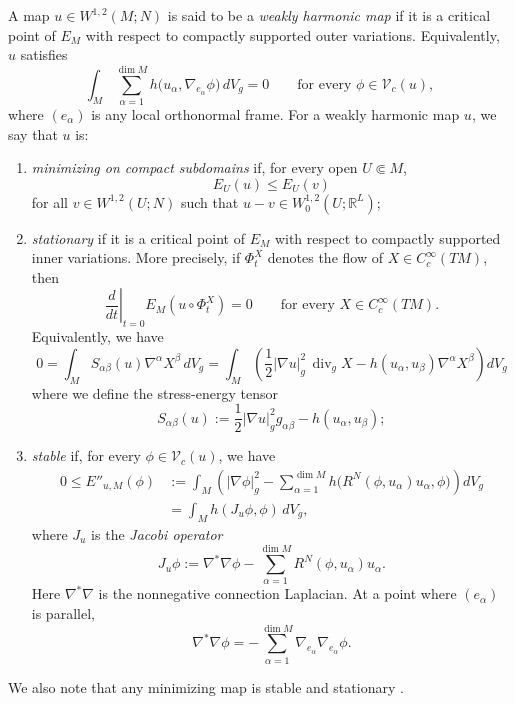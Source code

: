 \documentclass[11pt]{article}
\theoremstyle{plain}
\numberwithin{equation}{section}
\theoremstyle{definition}
\def \mc{\mathcal}
\def \mb{\mathbb}
\DeclareMathOperator{\ddiv}{div}
\begin{document}
A map $u\in W^{1,2}(M;N)$ is said to be a \textit{weakly harmonic map}
if it is a critical point of $E_M$ with respect to compactly supported
outer variations.  Equivalently, $u$ satisfies 
\begin{equation}
    \label{eq:weakHarmonicMap}
    \int_M\sum_{\alpha=1}^{\dim M}
    h\bigl(u_\alpha,\nabla_{e_\alpha}\phi\bigr)\,dV_g=0
    \qquad\text{for every }\phi\in\mc V_c(u),
\end{equation}
where $(e_\alpha)$ is any local orthonormal frame.   For
a weakly harmonic map $u$, we say that $u$ is:
\begin{enumerate}
\item \textit{minimizing on compact subdomains} if, for every open $U\Subset M$,
\[
E_U(u)\leq E_U(v)
\]
for all $v\in W^{1,2}(U;N)$ such that
$u-v\in W^{1,2}_0(U;\mb{R}^{L})$;

\item \textit{stationary} if it is a critical point of $E_M$ with respect to
compactly supported inner variations.  More precisely, if $\Phi_t^X$ denotes
the flow of $X\in C_c^\infty(TM)$, then
\begin{equation}
    \label{eq:stationarityInnerVariations}
    \left.\frac{d}{dt}\right|_{t=0}E_M(u\circ\Phi_t^X)=0
    \qquad\text{for every }X\in C_c^\infty(TM).
\end{equation}
Equivalently,  we have
\begin{equation}
    \label{eq:statM}
    0=\int_M S_{\alpha\beta}(u)\nabla^\alpha X^\beta\,dV_g
    =\int_M\left(
    \frac12|\nabla u|_g^2\,\ddiv_gX
    -h(u_\alpha,u_\beta)
      \nabla^\alpha X^\beta
    \right)dV_g
\end{equation}
where  we define the stress-energy tensor
\[
S_{\alpha\beta}(u)
:=\frac12|\nabla u|_g^2g_{\alpha\beta}
-h(u_\alpha,u_\beta);
\]

\item \textit{stable} if, for every
$\phi\in \mc V_c(u)$, we have
\begin{equation}
\label{eq:stabilitydef}
\begin{aligned}
0\leq E''_{u,M}(\phi)
&:=\int_M
\left(
|\nabla\phi|_g^2
-\sum_{\alpha=1}^{\dim M}
h\bigl(R^N(\phi,u_\alpha)u_\alpha,\phi\bigr)
\right)
dV_g\\
&=\int_M h(J_u\phi,\phi)\,dV_g,
\end{aligned}
\end{equation}
where $J_u$ is the \textit{Jacobi operator}
\begin{equation}
    \label{eq:JacobiOperator}
    J_u\phi
    :=\nabla^*\nabla\phi
      -\sum_{\alpha=1}^{\dim M}
       R^N(\phi,u_\alpha)u_\alpha.
\end{equation}
Here $\nabla^*\nabla$ is the nonnegative connection Laplacian.  At a
point where $(e_\alpha)$ is parallel,
\begin{equation}
    \label{eq:ConnectionLaplacian}
    \nabla^*\nabla\phi
    =-\sum_{\alpha=1}^{\dim M}
      \nabla_{e_\alpha}\nabla_{e_\alpha}\phi.
\end{equation}
\end{enumerate}
We also note that any minimizing map is stable and stationary \cite{Lin2008}.
\end{document}
